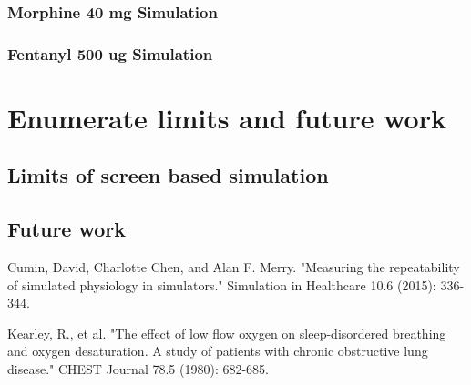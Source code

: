 \documentclass[a4paper]{article}
\begin{document}
\subsubsection{Morphine 40 mg Simulation}

\subsubsection{Fentanyl 500 ug Simulation}


\section{Enumerate limits and future work}
\subsection{Limits of screen based simulation}
\subsection{Future work}

\begin{thebibliography}{1}

   Cumin, David, Charlotte Chen, and Alan F. Merry. "Measuring the repeatability of simulated physiology in simulators." Simulation in Healthcare 10.6 (2015): 336-344.

  Kearley, R., et al. "The effect of low flow oxygen on sleep-disordered breathing and oxygen desaturation. A study of patients with chronic obstructive lung disease." CHEST Journal 78.5 (1980): 682-685.  



  \end{thebibliography}
\end{document}
